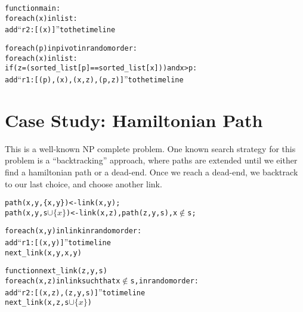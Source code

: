 \begin{alltt}
function main:
   for each (x) in list:
      add ``r2 : [(x)]'' to the timeline

   for each (p) in pivot in random order:
      for each (x) in list:
         if (z = (sorted_list[p] == sorted_list[x])) and x > p:
            add ``r1 : [(p),(x),(x,z),(p,z)]'' to the timeline
\end{alltt}


\section{Case Study: Hamiltonian Path}

This is a well-known NP complete problem.  One known search strategy for this problem is a ``backtracking'' approach, where paths are extended until we either find a hamiltonian path or a dead-end.  Once we reach a dead-end, we backtrack to our last choice, and choose another link.



\begin{alltt}
path(x,y,\{x,y\}) <- link(x,y);
path(x,y,s \(\cup \{x\}\)) <- link(x,z), path(z,y,s), x \(\not\in\) s;
\end{alltt}


\begin{alltt}
for each (x,y) in link in random order:
   add ``r1: [(x,y)]'' to timeline
   next_link(x,y,{x,y})

function next_link(z,y,s)
   for each (x,z) in link such that x \(\not\in\) s, in random order:
      add ``r2: [(x,z), (z,y,s)]'' to timeline
      next_link(x,z,s\(\cup\{x\}\))
\end{alltt}
